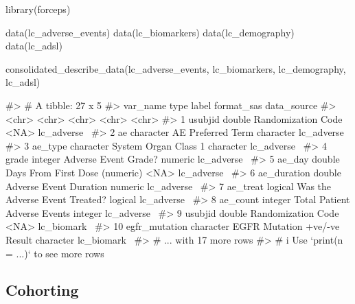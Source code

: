 \begin{Schunk}
\begin{Sinput}
library(forceps)

data(lc_adverse_events)
data(lc_biomarkers)
data(lc_demography)
data(lc_adsl)

consolidated_describe_data(lc_adverse_events,
                           lc_biomarkers,
                           lc_demography,
                           lc_adsl)
\end{Sinput}
\begin{Soutput}
#> # A tibble: 27 x 5
#>    var_name      type      label                          format_sas data_source
#>    <chr>         <chr>     <chr>                          <chr>      <chr>      
#>  1 usubjid       double    Randomization Code             <NA>       lc_adverse~
#>  2 ae            character AE Preferred Term              character  lc_adverse~
#>  3 ae_type       character System Organ Class 1           character  lc_adverse~
#>  4 grade         integer   Adverse Event Grade?           numeric    lc_adverse~
#>  5 ae_day        double    Days From First Dose (numeric) <NA>       lc_adverse~
#>  6 ae_duration   double    Adverse Event Duration         numeric    lc_adverse~
#>  7 ae_treat      logical   Was the Adverse Event Treated? logical    lc_adverse~
#>  8 ae_count      integer   Total Patient Adverse Events   integer    lc_adverse~
#>  9 usubjid       double    Randomization Code             <NA>       lc_biomark~
#> 10 egfr_mutation character EGFR Mutation +ve/-ve Result   character  lc_biomark~
#> # ... with 17 more rows
#> # i Use `print(n = ...)` to see more rows
\end{Soutput}
\end{Schunk}

\hypertarget{cohorting}{%
\subsection{Cohorting}\label{cohorting}}

